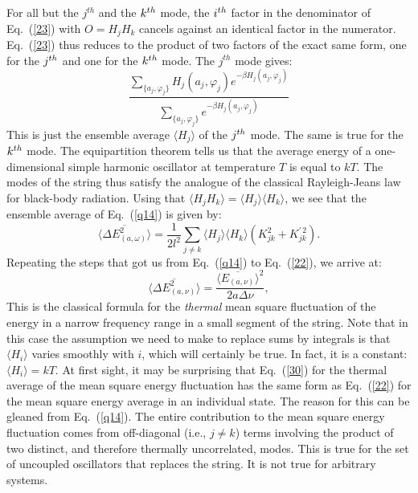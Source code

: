 \documentclass{elsart}
\begin{document}
For all but the $j^{th}$ and the $k^{\rm th}$ mode, the $i^{\rm th}$ factor in the denominator of Eq.\ (\ref{23}) with $O=H_j H_k$ cancels against an identical factor in the numerator. Eq.\ (\ref{23}) thus reduces to the product of two factors of the exact same form, one for the $j^{\rm th}$ and one for the $k^{\rm th}$ mode. The $j^{th}$ mode gives:
\begin{equation}
\frac{\displaystyle{\sum_{\{ a_j, \varphi_j\}} H_j(a_j, \varphi_j) e^{- \displaystyle{\beta H_j(a_j, \varphi_j)}}}}{\displaystyle{\sum_{\{ a_j, \varphi_j\}} e^{- \displaystyle{\beta H_j(a_j, \varphi_j)}}}}
\label{27}
\end{equation}
This is just the ensemble average $\langle H_j \rangle$ of the $j^{\rm th}$ mode. The same is true for the $k^{\rm th}$ mode. The equipartition theorem tells us that the average energy of a one-dimensional simple harmonic oscillator at temperature $T$ is equal to $kT$. The modes of the string thus satisfy the analogue of the classical Rayleigh-Jeans law for black-body radiation. Using that $\langle H_j H_k \rangle = \langle H_j  \rangle \langle  H_k \rangle$, we see that the ensemble average of Eq.\ (\ref{q14}) is given by:
\begin{equation}
\langle \overline{\Delta E_{(a, \omega)}^2} \rangle =
 \frac{1}{2l^2} \sum_{j \neq k} \langle H_j \rangle \langle H_k \rangle \left( K^2_{jk} + K^{\prime \, 2}_{jk} \right).
\label{29}
\end{equation}
Repeating the steps that got us from Eq.\ (\ref{q14}) to Eq.\ (\ref{22}), we arrive at:
\begin{equation}
\langle \overline{ \Delta E_{(a, \nu)}^2 } \rangle = 
\frac{ \langle \overline{E_{(a, \nu)} } \rangle^2 }{2a \Delta \nu},
\label{30}
\end{equation}
This is the classical formula for the {\it thermal} mean square fluctuation of the energy in a narrow frequency range in a small segment  of the string. Note that in this case the assumption we need to make to replace sums by integrals is that $\langle H_i \rangle$ varies smoothly with $i$, which will certainly be true. In fact,  it is a constant: $\langle H_i \rangle = kT$. At first sight, it may be surprising that Eq.\ (\ref{30}) for the thermal average of the mean square energy fluctuation has the same form as Eq.\ (\ref{22}) for the mean square energy average in an individual state. The reason for this can be gleaned from Eq.\ (\ref{q14}). The entire
contribution to the mean square energy fluctuation comes from off-diagonal (i.e., $j \neq k$) terms involving the product of two distinct, and therefore thermally uncorrelated, modes. This is true for the set of uncoupled oscillators that replaces the string. It is not true for arbitrary systems.
\end{document}
